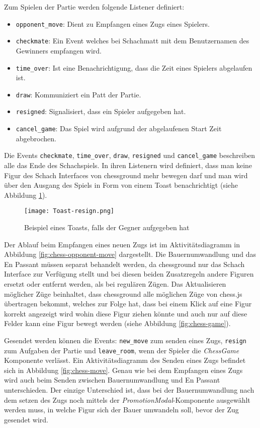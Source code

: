 Zum Spielen der Partie werden folgende Listener definiert:
\begin{itemize}
\item \verb|opponent_move|: Dient zu Empfangen eines Zugs eines Spielers.
\item \verb|checkmate|: Ein Event welches bei Schachmatt mit dem Benutzernamen des Gewinners empfangen wird.
\item \verb|time_over|: Ist eine Benachrichtigung, dass die Zeit eines Spielers abgelaufen ist.
\item \verb|draw|: Kommuniziert ein Patt der Partie.
\item \verb|resigned|: Signalisiert, dass ein Spieler aufgegeben hat.
\item \verb|cancel_game|: Das Spiel wird aufgrund der abgelaufenen Start Zeit abgebrochen.
\end{itemize}
Die Events \verb|checkmate|, \verb|time_over|, \verb|draw|, \verb|resigned| und \verb|cancel_game| beschreiben alle das Ende des Schachspiels. In ihren Listenern wird definiert, dass man keine Figur des Schach Interfaces von chessground mehr bewegen darf und man wird über den Ausgang des Spiels in Form von einem Toast benachrichtigt (siehe Abbildung \ref{fig:resign-toast}).

\begin{figure}[h]
\centering
\texttt{[image: Toast-resign.png]}
\caption{Beispiel eines Toasts, falls der Gegner aufgegeben hat}
\label{fig:resign-toast}
\end{figure}

Der Ablauf beim Empfangen eines neuen Zugs ist im Aktivitätsdiagramm in Abbildung \ref{fig:chess-opponent-move} dargestellt. Die Bauernumwandlung und das En Passant müssen separat behandelt werden, da chessground nur das Schach Interface zur Verfügung stellt und bei diesen beiden Zusatzregeln andere Figuren ersetzt oder entfernt werden, als bei regulären Zügen. Das Aktualisieren möglicher Züge beinhaltet, dass chessground alle möglichen Züge von chess.js übertragen bekommt, welches zur Folge hat, dass bei einem Klick auf eine Figur korrekt angezeigt wird wohin diese Figur ziehen könnte und auch nur auf diese Felder kann eine Figur bewegt werden (siehe Abbildung \ref{fig:chess-game}).

Gesendet werden können die Events: \verb|new_move| zum senden eines Zugs, \verb|resign| zum Aufgaben der Partie und \verb|leave_room|, wenn der Spieler die \textit{ChessGame} Komponente verlässt.
Ein Aktivitätsdiagramm des Senden eines Zugs befindet sich in Abbildung \ref{fig:chess-move}. Genau wie bei dem Empfangen eines Zugs wird auch beim Senden zwischen Bauernumwandlung und En Passant unterschieden. Der einzige Unterschied ist, dass bei der Bauernumwandlung nach dem setzen des Zugs noch mittels der  \textit{PromotionModal}-Komponente ausgewählt werden muss, in welche Figur sich der Bauer umwandeln soll, bevor der Zug gesendet wird.

